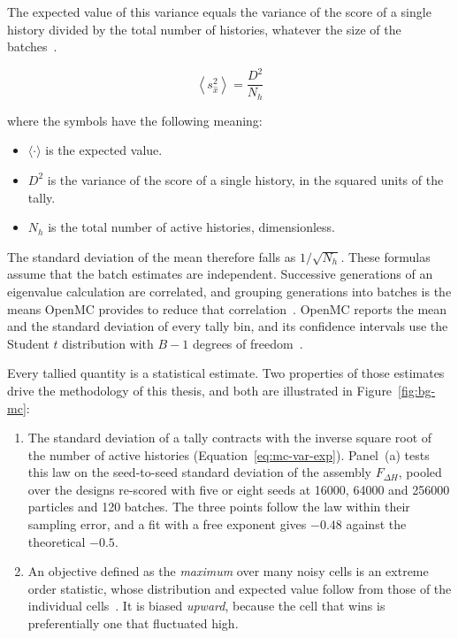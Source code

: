 The expected value of this variance equals the variance of the score of
a single history divided by the total number of histories, whatever the
size of the batches~\cite{lux_koblinger_1991}.

\begin{equation}
\left\langle s_{\hat{x}}^2 \right\rangle = \frac{D^2}{N_h}
\label{eq:mc-var-exp}
\end{equation}

\noindent where the symbols have the following meaning:

\begin{itemize}
  \item $\langle\cdot\rangle$ is the expected value.

  \item $D^2$ is the variance of the score of a single history, in the
        squared units of the tally.

  \item $N_h$ is the total number of active histories, dimensionless.
\end{itemize}

The standard deviation of the mean therefore falls as $1/\sqrt{N_h}$.
These formulas assume that the batch estimates are independent.
Successive generations of an eigenvalue calculation are correlated, and
grouping generations into batches is the means OpenMC provides to reduce
that correlation~\cite{romano_openmc_2015}. OpenMC reports the mean and
the standard deviation of every tally bin, and its confidence intervals
use the Student $t$ distribution with $B-1$ degrees of
freedom~\cite{openmc_docs}.

Every tallied quantity is a statistical estimate. Two properties of
those estimates drive the methodology of this thesis, and both are
illustrated in Figure~\ref{fig:bg-mc}:

\begin{enumerate}
  \item The standard deviation of a tally contracts with the inverse
        square root of the number of active histories
        (Equation~\eqref{eq:mc-var-exp}). Panel~(a) tests this law
        on the seed-to-seed standard deviation of the assembly
        $F_{\Delta H}$, pooled over the designs re-scored with five or
        eight seeds at \num{16000}, \num{64000} and \num{256000}
        particles and 120 batches. The three points follow the law within
        their sampling error, and a fit with a free exponent gives
        $-0.48$ against the theoretical $-0.5$.

  \item An objective defined as the \emph{maximum} over many noisy
        cells is an extreme order statistic, whose distribution and
        expected value follow from those of the individual
        cells~\cite{david_nagaraja_2003}. It is biased \emph{upward},
        because the cell that wins is preferentially one that
        fluctuated high.
\end{enumerate}

